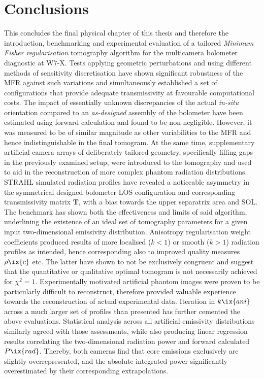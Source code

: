     \section{Conclusions}\label{sec:conclusionschap4}%
%
        This concludes the final physical chapter of this thesis and therefore the introduction, benchmarking and experimental evaluation of a tailored \textit{Minimum Fisher regularisation} tomography algorithm for the multicamera bolometer diagnostic at W7-X. Tests applying geometric perturbations and using different methods of sensitivity discretisation have shown significant robustness of the MFR against such variations and simultaneously established a set of configurations that provide adequate transmissivity at favourable computational costs. The impact of essentially unknown discrepancies of the actual \textit{in-situ} orientation compared to an \textit{as-designed} assembly of the bolometer have been estimated using forward calculation and found to be non-negligible. However, it was measured to be of similar magnitude as other variabilities to the MFR and hence indistinguishable in the final tomogram. At the same time, supplementary artificial camera arrays of deliberately tailored geometry, specifically filling gaps in the previously examined setup, were introduced to the tomography and used to aid in the reconstruction of more complex phantom radiation distributions. STRAHL simulated radiation profiles have revealed a noticeable asymmetry in the symmetrical designed bolometer LOS configuration and corresponding transmissivity matrix $\mathbf{T}$, with a bias towards the upper separatrix area and SOL.\\%
        The benchmark has shown both the effectiveness and limits of said algorithm, underlining the existence of an ideal set of tomography parameters for a given input two-dimensional emissivity distribution. Anisotropy regularisation weight coefficients produced results of more localised ($k<1$) or smooth ($k>1$) radiation profiles as intended, hence corresponding also to improved quality measures $\rho\ix{c}$ etc. The latter have shown to not be exclusively congruent and suggest that the quantitative or qualitative optimal tomogram is not necessarily achieved for $\chi^{2}=1$. Experimentally motivated artificial phantom images were proven to be particularly difficult to reconstruct, therefore provided valuable experience towards the reconstruction of actual experimental data. Iteration in $k\ix{ani}$ across a much larger set of profiles than presented has further cemented the above evaluations. Statistical analysis across all artificial emissivity distributions similarly agreed with those assessments, while also producing linear regression results correlating the two-dimensional radiation power and forward calculated $P\ix{rad}$. Thereby, both cameras find that core emissions exclusively are slightly overrepresented, and the absolute integrated power significantly overestimated by their corresponding extrapolations.\\%
